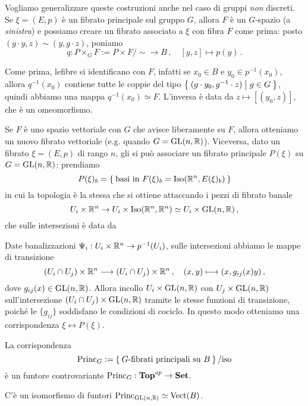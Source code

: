 Vogliamo generalizzare queste costruzioni anche nel caso di gruppi \emph{non} discreti.
Se $\xi = (E,p)$ è un fibrato principale sul gruppo $G$, allora $F$ è un $G$-spazio (a \emph{sinistra})
e possiamo creare un fibrato associato a $\xi$ con fibra $F$ come prima:
posto $(g \cdot y,z) \sim (y, g \cdot z)$, poniamo
\begin{equation*}
	q : P \times_{G} F  := P \times F/\sim \longrightarrow B\,,
	\quad {[y,z]} \longmapsto p(y)\,.
\end{equation*}

Come prima, lefibre si identificano con $F$, infatti se $x_{0} \in B$ e $y_{0} \in p^{-1}(x_{0})$,
allora $q^{-1}(x_{0})$ contiene tutte le coppie del tipo $\Set{(g \cdot y_{0},g^{-1} \cdot z) | g \in G}$,
quindi abbiamo una mappa $q^{-1}(x_{0}) \simeq F$. L'inversa è data da $z \mapsto [(y_{0},z)]$,
che è un omeomorfismo.

Se $F$ è uno spazio vettoriale con $G$ che avisce liberamente su $F$,
allora otteniamo un nuovo fibrato vettoriale (e.g. quando $G = \mathrm{GL}(n,{\mathbb R})$).
Viceversa, dato un fibrato $\xi = (E,p)$ di rango $n$,
gli si può associare un fibrato principale $P(\xi)$ su $G=\mathrm{GL}(n,{\mathbb R})$:
prendiamo
\begin{equation*}
	P(\xi)_{b} = \Set{\text{basi in } F(\xi)_{b} = \mathrm{Iso}({\mathbb R}^{n},E(\xi)_{b})}
\end{equation*}
in cui la topologia è la stessa che si ottiene attaccando i pezzi di fibrato banale
$$U_{i} \times {\mathbb R}^{n} \to U_{i} \times \mathrm{Iso}({\mathbb R}^{n},{\mathbb R}^{n}) 
\simeq U_{i} \times \mathrm{GL}(n,{\mathbb R})\,,$$
che sulle intersezioni è data da

Date banalizzazioni $\Psi_{i}:U_{i} \times {\mathbb R}^{n} \to p^{-1}(U_{i})$,
sulle intersezioni abbiamo le mappe di transizione
\begin{equation*}
	(U_{i} \cap U_{j}) \times {\mathbb R}^{n} \longrightarrow (U_{i} \cap U_{j}) \times {\mathbb R}^{n} \,,
	\quad (x,y) \longmapsto (x, g_{ij}(x) y)\,,
\end{equation*}
dove $g_{ij}(x) \in \mathrm{GL}(n,{\mathbb R})$. Allora incollo $U_{i} \times \mathrm{GL}(n,{\mathbb R})$
con $U_{j} \times \mathrm{GL}(n,{\mathbb R})$ sull'intersezione 
$(U_{i} \cap U_{j}) \times \mathrm{GL}(n,{\mathbb R})$ tramite le stesse funzioni di transizione,
poiché le $\{g_{ij}\}$ soddisfano le condizioni di cociclo.
In questo modo otteniamo una corrispondenza $\xi \leftrightarrow P(\xi)$.

\begin{thm}
	La corrispondenza
	\begin{equation*}
		\mathrm{Princ}_{G} := \Set{G\text{-fibrati principali su } B}/\text{iso}
	\end{equation*}
	è un funtore controvariante $\mathrm{Princ}_{G}:{\normalfont\textbf{Top}}^{op} \to {\normalfont\textbf{Set}}$.
\end{thm}

\begin{thm}
	C'è un isomorfismo di funtori $\mathrm{Princ}_{\mathrm{GL}(n,{\mathbb R})} \simeq \mathrm{Vect}(B)$.
\end{thm}














